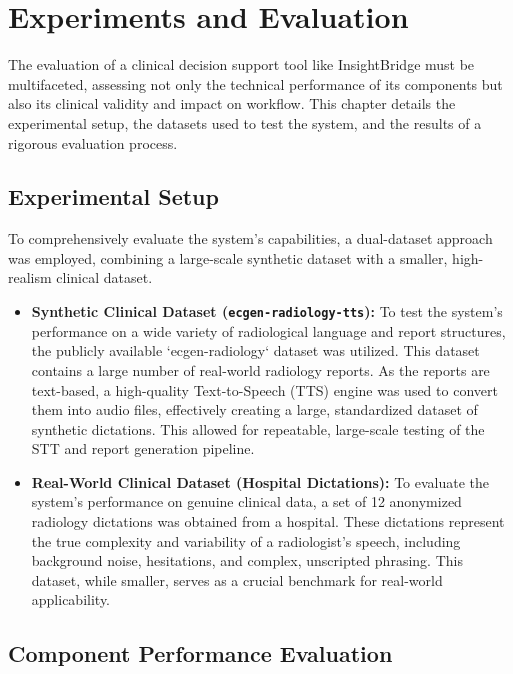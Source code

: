 \chapter{Experiments and Evaluation}
\label{cha:evaluation}

The evaluation of a clinical decision support tool like InsightBridge must be multifaceted, assessing not only the technical performance of its components but also its clinical validity and impact on workflow. This chapter details the experimental setup, the datasets used to test the system, and the results of a rigorous evaluation process.

\section{Experimental Setup}

To comprehensively evaluate the system's capabilities, a dual-dataset approach was employed, combining a large-scale synthetic dataset with a smaller, high-realism clinical dataset.

\begin{itemize}
    \item \textbf{Synthetic Clinical Dataset (\texttt{ecgen-radiology-tts}):} To test the system's performance on a wide variety of radiological language and report structures, the publicly available `ecgen-radiology` dataset was utilized. This dataset contains a large number of real-world radiology reports. As the reports are text-based, a high-quality Text-to-Speech (TTS) engine was used to convert them into audio files, effectively creating a large, standardized dataset of synthetic dictations. This allowed for repeatable, large-scale testing of the STT and report generation pipeline.
    
    \item \textbf{Real-World Clinical Dataset (Hospital Dictations):} To evaluate the system's performance on genuine clinical data, a set of 12 anonymized radiology dictations was obtained from a hospital. These dictations represent the true complexity and variability of a radiologist's speech, including background noise, hesitations, and complex, unscripted phrasing. This dataset, while smaller, serves as a crucial benchmark for real-world applicability.
\end{itemize}

\section{Component Performance Evaluation}


